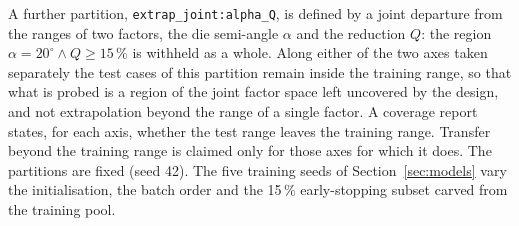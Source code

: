 A further partition, \texttt{extrap\_joint:alpha\_Q}, is defined by a joint departure from the ranges of two factors, the die semi-angle $\alpha$ and the reduction $Q$: the region $\alpha = 20^\circ \wedge Q \ge 15\,\%$ is withheld as a whole. Along either of the two axes taken separately the test cases of this partition remain inside the training range, so that what is probed is a region of the joint factor space left uncovered by the design, and not extrapolation beyond the range of a single factor. %
A coverage report states, for each axis, whether the test range leaves the training range. Transfer beyond the training range is claimed only for those axes for which it does. %
The partitions are fixed (seed 42). The five training seeds of Section~\ref{sec:models} vary the initialisation, the batch order and the 15\,\% early-stopping subset carved from the training pool. %

